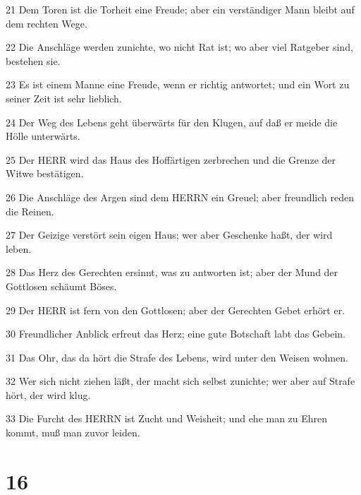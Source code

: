 \par 21 Dem Toren ist die Torheit eine Freude; aber ein verständiger Mann bleibt auf dem rechten Wege.
\par 22 Die Anschläge werden zunichte, wo nicht Rat ist; wo aber viel Ratgeber sind, bestehen sie.
\par 23 Es ist einem Manne eine Freude, wenn er richtig antwortet; und ein Wort zu seiner Zeit ist sehr lieblich.
\par 24 Der Weg des Lebens geht überwärts für den Klugen, auf daß er meide die Hölle unterwärts.
\par 25 Der HERR wird das Haus des Hoffärtigen zerbrechen und die Grenze der Witwe bestätigen.
\par 26 Die Anschläge des Argen sind dem HERRN ein Greuel; aber freundlich reden die Reinen.
\par 27 Der Geizige verstört sein eigen Haus; wer aber Geschenke haßt, der wird leben.
\par 28 Das Herz des Gerechten ersinnt, was zu antworten ist; aber der Mund der Gottlosen schäumt Böses.
\par 29 Der HERR ist fern von den Gottlosen; aber der Gerechten Gebet erhört er.
\par 30 Freundlicher Anblick erfreut das Herz; eine gute Botschaft labt das Gebein.
\par 31 Das Ohr, das da hört die Strafe des Lebens, wird unter den Weisen wohnen.
\par 32 Wer sich nicht ziehen läßt, der macht sich selbst zunichte; wer aber auf Strafe hört, der wird klug.
\par 33 Die Furcht des HERRN ist Zucht und Weisheit; und ehe man zu Ehren kommt, muß man zuvor leiden.

\chapter{16}

